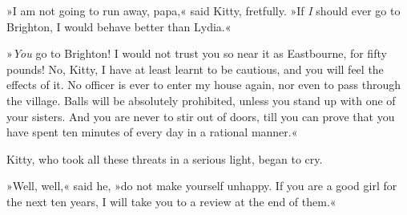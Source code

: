 »I am not going to run away, papa,« said Kitty, fretfully. »If \textit{I} should ever go to Brighton, I would behave better than Lydia.«

»\textit{You} go to Brighton! I would not trust you so near it as Eastbourne, for fifty pounds! No, Kitty, I have at least learnt to be cautious, and you will feel the effects of it. No officer is ever to enter my house again, nor even to pass through the village. Balls will be absolutely prohibited, unless you stand up with one of your sisters. And you are never to stir out of doors, till you can prove that you have spent ten minutes of every day in a rational manner.«

Kitty, who took all these threats in a serious light, began to cry.

»Well, well,« said he, »do not make yourself unhappy. If you are a good girl for the next ten years, I will take you to a review at the end of them.«
